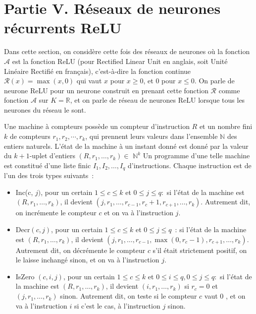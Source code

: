 \documentclass[10pt]{article}
\begin{document}
\section{Partie V. Réseaux de neurones récurrents ReLU}
Dans cette section, on considère cette fois des réseaux de neurones où la fonction $\mathcal{A}$ est la fonction ReLU (pour Rectified Linear Unit en anglais, soit Unité Linéaire Rectifié en français), c'est-à-dire la fonction continue $\mathcal{R}(x)=\max (x, 0)$ qui vaut $x$ pour $x ≥ 0$, et 0 pour $x ≤ 0$. On parle de neurone ReLU pour un neurone construit en prenant cette fonction $\mathcal{R}$ comme fonction $\mathcal{A}$ sur $K=ℝ$, et on parle de réseau de neurones ReLU lorsque tous les neurones du réseau le sont.

Une machine à compteurs possède un compteur d'instruction $R$ et un nombre fini $k$ de compteurs $r_{1}, r_{2}, \cdots, r_{k}$, qui prennent leurs valeurs dans l'ensemble $\mathbb{N}$ des entiers naturels. L'état de la machine à un instant donné est donné par la valeur du $k+1$-uplet d'entiers $\left(R, r_{1}, \ldots, r_{k}\right) \in$ $\mathbb{N}^{k}$ Un programme d'une telle machine est constitué d'une liste finic $I_{1}, I_{2}, \ldots, I_{q}$ d'instructions. Chaque instruction est de l'un des trois types suivants :

\begin{itemize}
  \item Inc(c, $j)$, pour un certain $1 ≤ c ≤ k$ et $0 ≤ j ≤ q:$ si l'état de la machine est $\left(R, r_{1}, \ldots, r_{k}\right)$, il devient $\left(j, r_{1}, \ldots, r_{c-1}, r_{c}+1, r_{c+1}, \ldots, r_{k}\right)$. Autrement dit, on incrémente le compteur $c$ et on va à l'instruction $j$.

  \item $\mathrm{Decr}(c, j)$, pour un certain $1 ≤ c ≤ k$ et $0 ≤ j ≤ q$ : si l'état de la machine est $\left(R, r_{1}, \ldots, r_{k}\right)$, il devient $\left(j, r_{1}, \ldots, r_{c-1}, \max \left(0, r_{c}-1\right), r_{c+1}, \ldots, r_{k}\right)$. Autrement dit, on décrémente le compteur $c$ s'il était strictement positif, on le laisse inchangé sinon, et on va à l'instruction $j$.

  \item IsZero $(c, i, j)$, pour un certain $1 ≤ c ≤ k$ et $0 ≤ i ≤ q, 0 ≤ j ≤ q:$ si l'état de la machine est $\left(R, r_{1}, \ldots, r_{k}\right)$, il devient $\left(i, r_{1}, \ldots, r_{k}\right)$ si $r_{c}=0$ et $\left(j, r_{1}, \ldots, r_{k}\right)$ sinon. Autrement dit, on teste si le compteur $c$ vaut 0 , et on va à l'instruction $i$ si c'est le cas, à l'instruction $j$ sinon.

\end{itemize}
\end{document}
